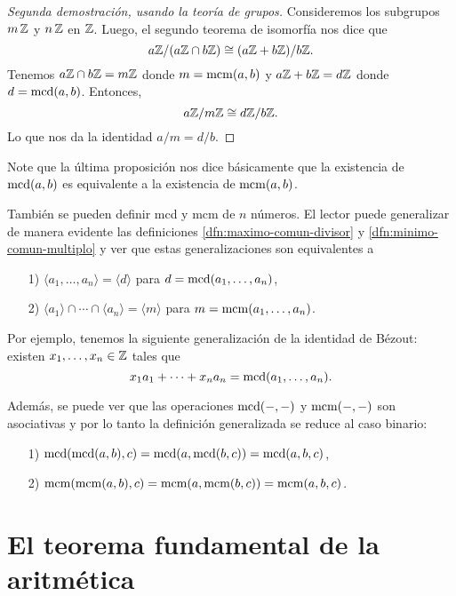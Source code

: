 \documentclass{article}
\numberwithin{equation}{section}
\begin{document}
\begin{proof}[Segunda demostración, usando la teoría de grupos]
  Consideremos los subgrupos $m\,\mathbb{Z}$ y $n\,\mathbb{Z}$ en $\mathbb{Z}$. Luego, el segundo
  teorema de isomorfía nos dice que
  $$a\mathbb{Z}/(a\mathbb{Z}\cap b\mathbb{Z}) \cong (a\mathbb{Z} + b\mathbb{Z})/b\mathbb{Z}.$$
  Tenemos $a\mathbb{Z}\cap b\mathbb{Z} = m\mathbb{Z}$
  donde $m = \operatorname{mcm} (a,b)$ y $a\mathbb{Z} + b\mathbb{Z} = d\mathbb{Z}$ donde
  $d = \operatorname{mcd} (a,b)$. Entonces,
  $$a\mathbb{Z}/m\mathbb{Z} \cong d\mathbb{Z}/b\mathbb{Z}.$$
  Lo que nos da la identidad $a/m = d/b$.
\end{proof}

Note que la última proposición nos dice básicamente que la existencia de
$\operatorname{mcd} (a,b)$ es equivalente a la existencia de $\operatorname{mcm} (a,b)$.

También se pueden definir mcd y mcm de $n$ números. El lector puede generalizar
de manera evidente las definiciones \ref{dfn:maximo-comun-divisor} y
\ref{dfn:minimo-comun-multiplo} y ver que estas generalizaciones son
equivalentes a
\begin{enumerate}
\item[1)] $\langle a_1, \ldots, a_n\rangle = \langle d\rangle$ para
  $d = \operatorname{mcd} (a_1, \ldots, a_n)$,

\item[2)]
  $\langle a_1\rangle \cap \cdots \cap \langle a_n\rangle = \langle m\rangle$
  para $m = \operatorname{mcm} (a_1, \ldots, a_n)$.
\end{enumerate}

Por ejemplo, tenemos la siguiente generalización de la identidad de Bézout:
existen $x_1,\ldots,x_n \in \mathbb{Z}$ tales que
$$x_1 a_1 + \cdots + x_n a_n = \operatorname{mcd} (a_1, \ldots, a_n).$$

Además, se puede ver que las operaciones $\operatorname{mcd} (-,-)$ y $\operatorname{mcm} (-,-)$ son
asociativas y por lo tanto la definición generalizada se reduce al caso binario:
\begin{enumerate}
\item[1)] $\operatorname{mcd} (\operatorname{mcd} (a, b), c) = \operatorname{mcd} (a, \operatorname{mcd} (b, c)) = \operatorname{mcd} (a, b, c)$,

\item[2)] $\operatorname{mcm} (\operatorname{mcm} (a, b), c) = \operatorname{mcm} (a, \operatorname{mcm} (b, c)) = \operatorname{mcm} (a, b, c)$.
\end{enumerate}


\section{El teorema fundamental de la aritmética}
\end{document}
